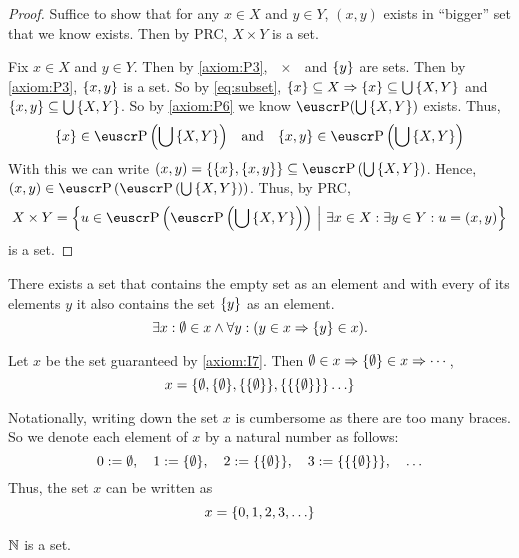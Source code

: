 \begin{proof}
	Suffice to show that for any \(x \in X\) and \(y \in Y\), \((x, y)\) exists in ``bigger'' set that we know exists. Then by PRC, \(X \times Y\) is a set.

	\noindent Fix \(x \in X\) and \(y \in Y\). Then by \cref{axiom:P3}, \(\qty{x}\) and \(\qty{y}\) are sets. Then by \cref{axiom:P3}, \(\qty{x, y}\) is a set. So by \cref{eq:subset}, \(\qty{x} \subseteq X \Rightarrow \qty{x} \subseteq \bigcup \qty{X, Y}\) and \(\qty{x, y} \subseteq \bigcup \qty{X, Y}\). So by \cref{axiom:P6} we know \(\powerset(\bigcup\qty{X, Y})\) exists. Thus,
	\begin{equation}
		\qty{x} \in \powerset\qty(\bigcup\qty{X, Y}) \quad \text{and} \quad \qty{x, y} \in \powerset\qty(\bigcup\qty{X, Y})
	\end{equation}
	With this we can write \((x, y) = \qty{\qty{x}, \qty{x, y}} \subseteq \powerset\qty(\bigcup\qty{X, Y})\). Hence, \((x, y) \in \powerset\qty(\powerset\qty(\bigcup\qty{X, Y}))\). Thus, by PRC,
	\begin{equation}
		X \times Y = \qty{u \in \powerset\qty(\powerset\qty(\bigcup\qty{X, Y})) \mid \exists x \in X: \exists y \in Y: u = (x, y)}
	\end{equation}
	is a set.
\end{proof}

\begin{axiom}\label{axiom:I7}
	There exists a set that contains the empty set as an element and with every of its elements \(y\) it also contains the set \(\qty{y}\) as an element.
	\begin{equation}
		\exists x: \emptyset \in x \land \forall y: (y \in x \Rightarrow \qty{y} \in x).
	\end{equation}
\end{axiom}

\begin{remark}
	Let \(x\) be the set guaranteed by \cref{axiom:I7}. Then \(\emptyset \in x \Rightarrow \qty{\emptyset} \in x \Rightarrow \cdots\),
	\begin{equation}
		x = \qty{\emptyset, \qty{\emptyset}, \qty{\qty{\emptyset}}, \qty{\qty{\qty{\emptyset}}} \ldots}
	\end{equation}
\end{remark}
Notationally, writing down the set \(x\) is cumbersome as there are too many braces. So we denote each element of \(x\) by a natural number as follows:
\begin{equation}
	0 := \emptyset, \quad 1 := \qty{\emptyset}, \quad 2 := \qty{\qty{\emptyset}}, \quad 3 := \qty{\qty{\qty{\emptyset}}}, \quad \ldots
\end{equation}
Thus, the set \(x\) can be written as
\begin{equation}
	x = \qty{0, 1, 2, 3, \ldots}
\end{equation}
\begin{corollary}
	\(\mathbb N\) is a set.
\end{corollary}

